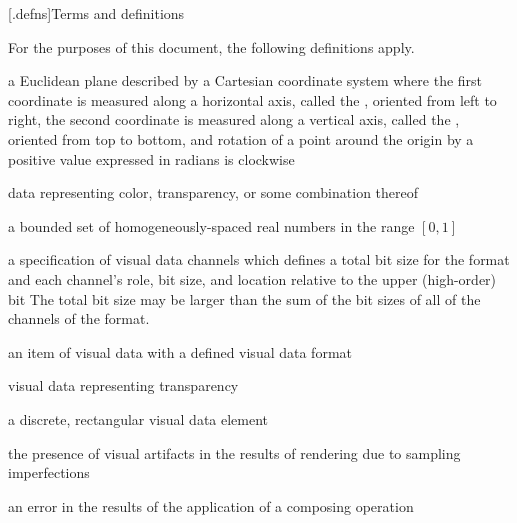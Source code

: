 
[\iotwod.defns]{Terms and definitions}

\pnum
{}
For the purposes of this document, the following definitions apply.

a Euclidean plane described by a Cartesian coordinate system where the first coordinate is measured along a horizontal axis, called the \xaxis, oriented from left to right, the second coordinate is measured along a vertical axis, called the \yaxis, oriented from top to bottom, and rotation of a point around the origin by a positive value expressed in radians is clockwise

data representing color, transparency, or some combination thereof

a bounded set of homogeneously-spaced real numbers in the range $[0,1]$

%
a specification of visual data channels which defines a total bit size for the format and each channel's role, bit size, and location relative to the upper (high-order) bit
\enternote
The total bit size may be larger than the sum of the bit sizes of all of the channels of the format.
\exitnote

an item of visual data with a defined visual data format

visual data representing transparency

a discrete, rectangular visual data element

the presence of visual artifacts in the results of rendering due to 
sampling imperfections

an error in the results of the application of a composing operation 

